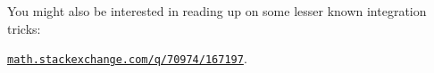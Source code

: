 You might also be interested in reading up on 
some lesser known integration tricks:
\begin{center}
	\href{http://math.stackexchange.com/q/70974/167197}%
	{\texttt{math.stackexchange.com/q/70974/167197}}.
\end{center}



